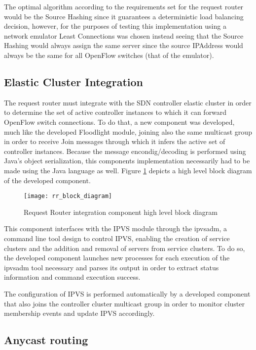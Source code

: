 %
The optimal algorithm according to the requirements set for the request router would be the Source Hashing since it guarantees a deterministic load balancing decision, however, for the purposes of testing this implementation using a network emulator Least Connections was chosen instead seeing that the Source Hashing would always assign the same server since the source \gls{IPAddress} would always be the same for all OpenFlow switches (that of the emulator).
%
\subsection{Elastic Cluster Integration}
The request router must integrate with the \gls{SDN} controller elastic cluster in order to determine the set of active controller instances to which it can forward OpenFlow switch connections.
To do that, a new component was developed, much like the developed Floodlight module, joining also the same multicast group in order to receive Join messages through which it infers the active set of controller instances.
Because the message encondig/decoding is performed using Java's object serialization, this components implementation necessarily had to be made using the Java language as well.
Figure \ref{fig:rr_block_diagram} depicts a high level block diagram of the developed component.\\
%
\begin{figure}
	\centering
	\texttt{[image: rr\_block\_diagram]}
	\caption{Request Router integration component high level block diagram}
	\label{fig:rr_block_diagram}
\end{figure}
%
This component interfaces with the \gls{IPVS} module through the ipvsadm, a command line tool design to control \gls{IPVS}, enabling the creation of service clusters and the addition and removal of servers from service clusters.
To do so, the developed component launches new processes for each execution of the ipvsadm tool necessary and parses its output in order to extract status information and command execution success.


The configuration of IPVS is performed automatically by a developed component that also joins the controller cluster multicast group in order to monitor cluster membership events and update IPVS accordingly.

\subsection{Anycast routing}
%

